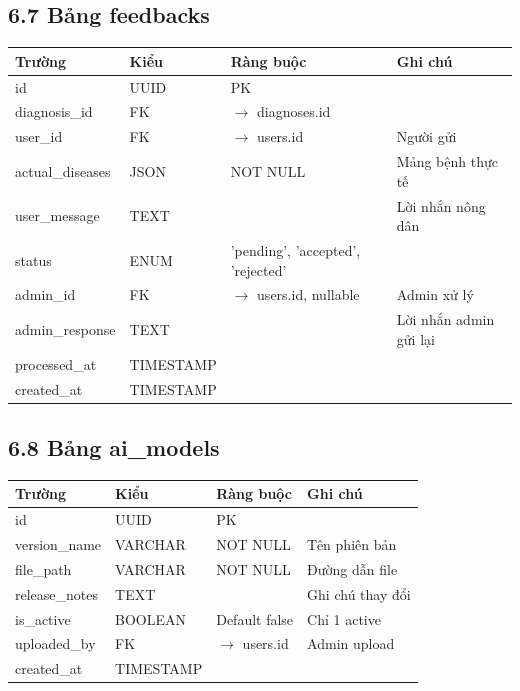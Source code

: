 ﻿\documentclass[12pt,a4paper]{article}
\begin{document}
\subsection*{6.7 Bảng feedbacks}
\begin{longtable}{|p{3cm}|p{2.5cm}|p{3cm}|p{5cm}|}
\hline
\rowcolor{headerblue}
\textbf{Trường} & \textbf{Kiểu} & \textbf{Ràng buộc} & \textbf{Ghi chú} \\
\hline
id & UUID & PK & \\
\hline
diagnosis\_id & FK & $\rightarrow$ diagnoses.id & \\
\hline
user\_id & FK & $\rightarrow$ users.id & Người gửi \\
\hline
actual\_diseases & JSON & NOT NULL & Mảng bệnh thực tế \\
\hline
user\_message & TEXT & & Lời nhắn nông dân \\
\hline
status & ENUM & 'pending', 'accepted', 'rejected' & \\
\hline
admin\_id & FK & $\rightarrow$ users.id, nullable & Admin xử lý \\
\hline
admin\_response & TEXT & & Lời nhắn admin gửi lại \\
\hline
processed\_at & TIMESTAMP & & \\
\hline
created\_at & TIMESTAMP & & \\
\hline
\end{longtable}

\subsection*{6.8 Bảng ai\_models}
\begin{longtable}{|p{3cm}|p{2.5cm}|p{3cm}|p{5cm}|}
\hline
\rowcolor{headerblue}
\textbf{Trường} & \textbf{Kiểu} & \textbf{Ràng buộc} & \textbf{Ghi chú} \\
\hline
id & UUID & PK & \\
\hline
version\_name & VARCHAR & NOT NULL & Tên phiên bản \\
\hline
file\_path & VARCHAR & NOT NULL & Đường dẫn file \\
\hline
release\_notes & TEXT & & Ghi chú thay đổi \\
\hline
is\_active & BOOLEAN & Default false & Chỉ 1 active \\
\hline
uploaded\_by & FK & $\rightarrow$ users.id & Admin upload \\
\hline
created\_at & TIMESTAMP & & \\
\hline
\end{longtable}
\end{document}
